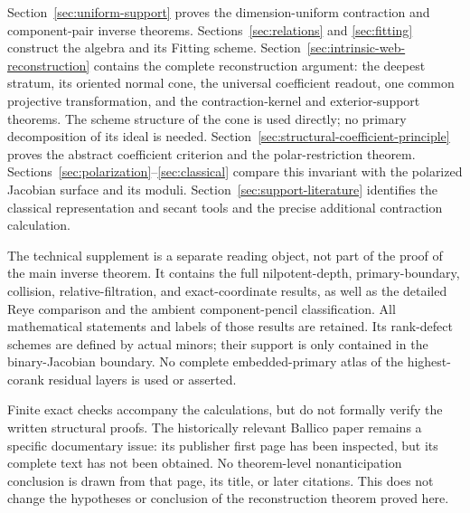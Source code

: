 Section~\ref{sec:uniform-support} proves the dimension-uniform
contraction and component-pair inverse theorems.
Sections~\ref{sec:relations} and \ref{sec:fitting} construct the algebra
and its Fitting scheme.  Section~\ref{sec:intrinsic-web-reconstruction}
contains the complete reconstruction argument: the deepest stratum,
its oriented normal cone, the universal coefficient readout, one
common projective transformation, and the contraction-kernel and
exterior-support theorems.  The scheme structure of the cone is
used directly; no primary decomposition of its ideal is needed.
Section~\ref{sec:structural-coefficient-principle} proves the abstract
coefficient criterion and the polar-restriction theorem.
Sections~\ref{sec:polarization}--\ref{sec:classical} compare this
invariant with the polarized Jacobian surface and its moduli.
Section~\ref{sec:support-literature} identifies the classical
representation and secant tools and the precise additional
contraction calculation.

The technical supplement is a separate reading object, not part of
the proof of the main inverse theorem.  It contains the full
nilpotent-depth, primary-boundary, collision, relative-filtration,
and exact-coordinate results, as well as the detailed Reye comparison
and the ambient component-pencil classification.  All mathematical
statements and labels of those results are retained.  Its rank-defect
schemes are defined by actual minors; their support is only contained
in the binary-Jacobian boundary.  No complete embedded-primary atlas
of the highest-corank residual layers is used or asserted.

Finite exact checks accompany the calculations, but do not formally
verify the written structural proofs.  The historically relevant
Ballico paper \cite{Ballico93} remains a specific documentary issue:
its publisher first page has been inspected, but its complete text
has not been obtained.  No theorem-level nonanticipation conclusion
is drawn from that page, its title, or later citations.
This does not change the hypotheses or conclusion of the reconstruction
theorem proved here.

